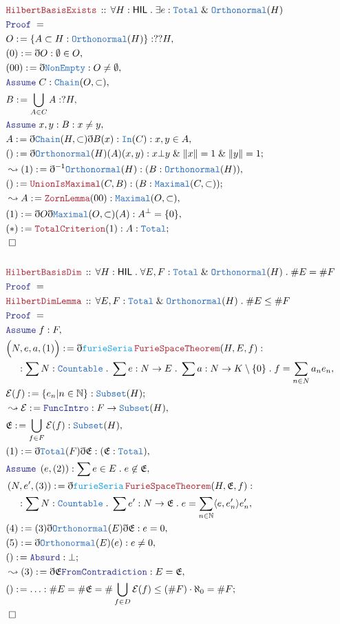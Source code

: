 \documentclass[12pt]{scrartcl}
\newcommand{\TYPE}[1]{\textcolor{NavyBlue}{\mathtt{#1}}}
\newcommand{\FUNC}[1]{\textcolor{Cerulean}{\mathtt{#1}}}
\newcommand{\LOGIC}[1]{\textcolor{Blue}{\mathtt{#1}}}
\newcommand{\THM}[1]{\textcolor{Maroon}{\mathtt{#1}}}
\renewcommand{\.}{\; . \;}
\newcommand{\de}{: \kern 0.1pc =}
\newcommand{\Theorem}[2]{& \THM{#1} \, :: \, #2 \\ & \Proof = \\ }
\newcommand{\NewLine}{\\ & \kern 1pc}
\newcommand{\Page}[1]{\begin{align*} #1 \end{align*} \newpage   }
\newcommand{ \bd }{ \ByDef }
\renewcommand{\And}{\; \& \;}
\newcommand{\Nat}{\mathbb{N} }
\newcommand{\Say}[3]{& #1 \de #2 : #3, \\}
\newcommand{\Conclude}[3]{& #1 \de #2 : #3; \\}
\newcommand{\Derive}[3]{& \leadsto #1 \de #2 : #3, \\}
\newcommand{\A}{\LOGIC{Assume} \;}
\newcommand{\Assume}[2]{& \A #1 : #2, \\}
\newcommand{\QED}{\; \square}
\newcommand{\EndProof}{& \QED \\}
\newcommand{\ByDef}{\eth}
\newcommand{\Proof}{\LOGIC{Proof} \; }
\newcommand{\HIL}{\textsf{HIL}}
\begin{document}
\Page{
 \Theorem{HilbertBasisExists}{\forall H : \HIL \. \exists e : \TYPE{Total} \And \TYPE{Orthonormal}(H)}
 \Say{O}{\{ A \subset H : \TYPE{Orthonormal}(H) \}}{??H}
 \Say{(0)}{\bd O}{\emptyset \in O}
 \Say{(00)}{\bd \TYPE{NonEmpty}}{O \neq \emptyset}
 \Assume{C}{\TYPE{Chain}(O,\subset)}
 \Say{B}{\bigcup_{A \in C} A}{?H}
 \Assume{x,y}{B : x \neq y}
 \Say{A}{\bd \TYPE{Chain}(H,\subset) \bd B(x)}{ \TYPE{In}(C) : x,y \in A}
 \Conclude{()}{\bd \TYPE{Orthonormal}(H)(A)(x,y)}{x \bot y \And \| x \| = 1 \And \| y \| = 1}
 \Derive{(1)}{\bd^{-1} \TYPE{Orthonormal}(H)}{(B : \TYPE{Orthonormal}(H))}
 \Conclude{()}{\THM{UnionIsMaximal}(C,B)}{(B : \TYPE{Maximal}(C,\subset) )}
 \Derive{A}{\THM{ZornLemma}(00)}{\TYPE{Maximal}(O,\subset)}
 \Say{(1)}{\bd O \bd \TYPE{Maximal}(O, \subset)(A)}{A^\bot = \{0\}}
 \Conclude{(*)}{\THM{TotalCriterion}(1)}{A : \TYPE{Total}}
 \EndProof
 \\
 \Theorem{HilbertBasisDim}{\forall H : \HIL \. \forall E, F : \TYPE{Total} \And 
 \TYPE{Orthonormal}(H) \. \# E = \# F }
 \Theorem{HilbertDimLemma}{ \forall E, F : \TYPE{Total} \And 
 \TYPE{Orthonormal}(H) \. \# E \le \# F }
 \Assume{f}{F}
 \Say{\Big(N, e,a,(1)\Big)}{\bd \FUNC{furieSeria} \,\THM{FurieSpaceTheorem}(H,E,f)}{ 
 \NewLine : 
 \sum N : \TYPE{Countable}
 \. \sum e : N \to E \. \sum a : N \to K \setminus \{0\} \. f = \sum_{n \in N } a_n e_n }
 \Conclude{\mathcal{E}(f)}{ \{ e_n | n \in \Nat  \} }{ \TYPE{Subset}(H) }    
 \Derive{\mathcal{E}}{\LOGIC{FuncIntro}}{F \to \TYPE{Subset}(H)}
 \Say{\mathfrak{E}}{\bigcup_{f \in F} \mathcal{E}(f)}{\TYPE{Subset}(H)}
 \Say{(1)}{ \bd \TYPE{Total}(F)\bd \mathfrak{E}}{ ( \mathfrak{E} : \TYPE{Total}) }
 \Assume{\left(e,(2)\right)}{\sum e \in E \. e \not \in \mathfrak{E}}
 \Say{\left(N,e',(3)\right)}{\bd \FUNC{furieSeria} \,\THM{FurieSpaceTheorem}(H,\mathfrak{E},f)}
 {\NewLine : \sum N : \TYPE{Countable} \. \sum e' : N \to \mathfrak{E} \. 
 e = \sum_{n \in \Nat}  \langle e, e'_n \rangle e'_n 
 }
 \Say{(4)}{(3)\bd \TYPE{Orthonormal}(E)\bd \mathfrak{E}}{e = 0}
 \Say{(5)}{\bd \TYPE{Orthonormal}(E)(e)}{ e \neq 0}
 \Conclude{()}{\LOGIC{Absurd}}{\bot}
 \Derive{(3)}{\bd \mathfrak{E}\LOGIC{FromContradiction}}{E = \mathfrak{E}}
 \Conclude{()}{\ldots}{\# E = \# \mathfrak{E} = \# \bigcup_{f \in D } \mathcal{E}(f) \le (\# F) \cdot \aleph_0 = \# F }
 \EndProof}
\end{document}
